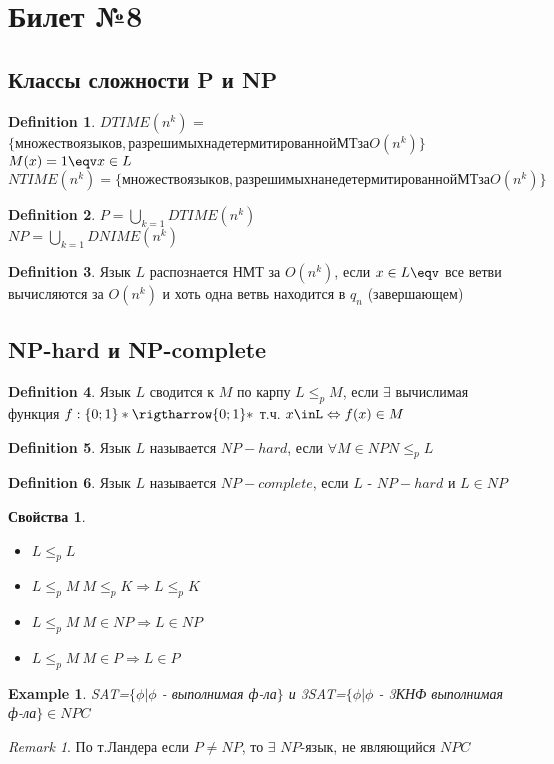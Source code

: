 \documentclass[a4paper]{article}
\theoremstyle{plain}
\newtheorem{example}{Example}
\theoremstyle{remark}
\newtheorem*{remark}{Remark}
\theoremstyle{definition}
\newtheorem{definition}{Definition}
\newtheorem{props}{Свойства}
\begin{document}
\section{Билет №8}
\subsection{Классы сложности P и NP}
\begin{definition}
$DTIME(n^k)$ = $\{множество языков, разрешимых на детермитированной МТ за O(n^k)\}$\\
$M(x)=1 \eqv x\in L$	\\
$NTIME(n^k) = \{множество языков, разрешимых на недетермитированной МТ за O(n^k)\}$
\end{definition}
\begin{definition}
$P=\bigcup_{k=1}DTIME(n^k)$\\
$NP=\bigcup_{k=1}DNIME(n^k)$\\
\end{definition}
\begin{definition}
Язык $L$ распознается НМТ за $O(n^k)$, если $x\in L \eqv$ все ветви вычисляются за $O(n^k)$ и хоть одна ветвь находится в $q_n$ (завершающем)	
\end{definition}
\subsection{NP-hard и NP-complete}
\begin{definition}
Язык $L$ сводится к $M$ по карпу $L\le_p M$, если $\exists$ вычислимая функция $f:\{0;1\}*\rigtharrow \{0;1\}*$ т.ч. $x\inL \Leftrightarrow f(x)\in M$	
\end{definition}
\begin{definition}
Язык $L$ называется $NP-hard$, если $\forall M\in NP N\le_pL$	
\end{definition}
\begin{definition}
Язык $L$ называется $NP-complete$, если $L$ - $NP-hard$ и $L\in NP$	
\end{definition}
\begin{props}
\begin{itemize}
		\item $L\le_pL$
		\item $L\le_pM\  M\le_pK \Rightarrow L\le_pK$
		\item $L\le_pM\ M\in NP \Rightarrow L\in NP$
		\item $L\le_pM\ M\in P \Rightarrow L\in P$
	\end{itemize}	
\end{props}
\begin{example}
	SAT=$\{\phi| \phi$ - выполнимая ф-ла$\}$ и 3SAT=$\{\phi| \phi$ - 3КНФ выполнимая ф-ла$\} \in NPC$
\end{example}
\begin{remark}
По т.Ландера если $P\ne NP$, то $\exists$ $NP$-язык, не являющийся $NPC$	
\end{remark}
\end{document}
